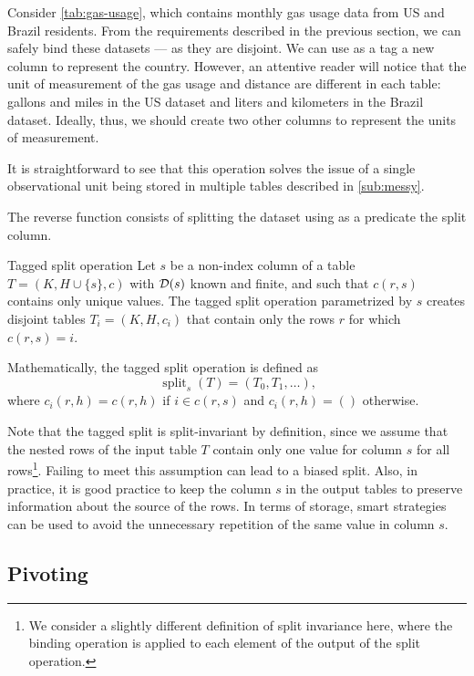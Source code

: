 Consider \cref{tab:gas-usage}, which contains monthly gas usage data from
US and Brazil residents.  From the requirements described in the previous section, we can
safely bind these datasets --- as they are disjoint.  We can use as a tag a new column to
represent the country.  However, an attentive reader will notice that the unit of
measurement of the gas usage and distance are different in each table: gallons and miles
in the US dataset and liters and kilometers in the Brazil dataset.  Ideally, thus, we
should create two other columns to represent the units of measurement.

It is straightforward to see that this operation solves the issue of a single
observational unit being stored in multiple tables described in \cref{sub:messy}.

The reverse function consists of splitting the dataset using as a predicate the split column.

\begin{definition}{Tagged split operation}\label{def:tagged-split}
  Let $s$ be a non-index column of a table $T = (K, H \cup \{s\}, c)$ with $\mathcal{D}\!\left(s\right)$
  known and finite, and such that $c(r, s)$ contains only unique values. The tagged split
  operation parametrized by $s$ creates disjoint tables $T_i = (K, H, c_i)$ that contain
  only the rows $r$ for which $c(r, s) = i$.

  Mathematically, the tagged split operation is defined as \[
    \operatorname{split}_{s}(T) = \left(T_0, T_1, \dots\right)\text{,}
  \] where $c_i(r, h) = c(r, h)$ if $i \in c(r, s)$ and $c_i(r, h) = ()$ otherwise.
\end{definition}

Note that the tagged split is split-invariant by definition, since we assume that the
nested rows of the input table $T$ contain only one value for column $s$ for all
rows\footnote{We consider a slightly different definition of split invariance here, where
the binding operation is applied to each element of the output of the split operation.}.
Failing to meet this assumption can lead to a biased split.  Also, in practice, it is
good practice to keep the column $s$ in the output tables to preserve information about
the source of the rows.  In terms of storage, smart strategies can be used to avoid the
unnecessary repetition of the same value in column $s$.

\subsection{Pivoting}

